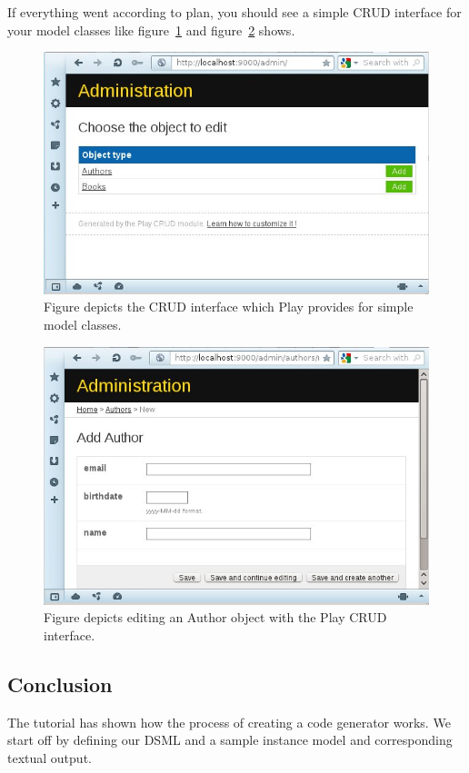 If everything went according to plan, you should see a simple CRUD interface for your model classes like figure~\ref{fig:crud1} and figure~\ref{fig:crud2} shows.
\begin{figure}[p]
  \centering
  \centerline{\includegraphics[scale=0.7]{images/crud1.jpeg}}
  \caption[CRUD interface for Play]{Figure depicts the CRUD interface which Play provides for simple model classes.}
  \label{fig:crud1}
\end{figure}
\begin{figure}[p]
  \centering
  \centerline{\includegraphics[scale=0.7]{images/crud2.jpeg}}
  \caption[CRUD interface for Play 2]{Figure depicts editing an Author object with the Play CRUD interface.}
  \label{fig:crud2}
\end{figure}

\subsection{Conclusion}
The tutorial has shown how the process of creating a code generator works. We start off by defining our DSML and a sample instance model and corresponding textual output.

